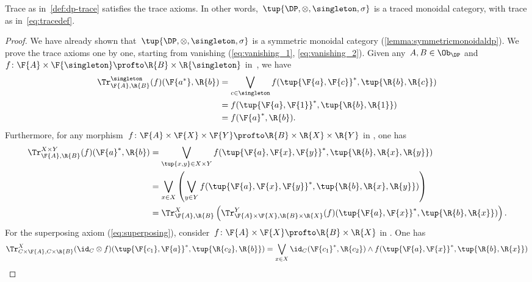 \begin{lemma}
    Trace as in~\cref{def:dp-trace} satisfies the trace axioms. In other words,~$\tup{\DP, \otimes, \singleton, \sigma}$ is a traced monoidal category, with trace as in~\cref{eq:tracedef}.
\end{lemma}
\begin{proof}
    We have already shown that~$\tup{\DP,\otimes,\singleton,\sigma}$ is a symmetric monoidal category (\cref{lemma:symmetricmonoidaldp}).
    We prove the trace axioms one by one, starting from vanishing (\cref{eq:vanishing_1}, \cref{eq:vanishing_2}). Given any~$A,B\in \Ob_\DP$ and~$f\colon \F{A}\times \F{\singleton}\profto \R{B}\times \R{\singleton}$ in~\DP, we have
    \begin{equation}
        \begin{aligned}
            \Tr_{\F{A},\R{B}}^{\singleton}(f)(\F{a^*},\R{b})&=\bigvee_{c\in \singleton}f(\tup{\F{a},\F{c}}^*,\tup{\R{b},\R{c}})\\
            &=f(\tup{\F{a},\F{1}}^*,\tup{\R{b},\R{1}})\\
            &=f(\F{a}^*,\R{b}).
        \end{aligned}
    \end{equation}
    Furthermore, for any morphism~$f\colon \F{A}\times \F{X}\times \F{Y} \profto \R{B}\times \R{X} \times \R{Y}$ in \DP, one has
    \begin{equation}
        \begin{aligned}
            \Tr_{\F{A},\R{B}}^{X\times Y}(f)(\F{a}^*,\R{b})&=\bigvee_{\tup{x,y} \in X\times Y} f(\tup{\F{a},\F{x},\F{y}}^*,\tup{\R{b},\R{x},\R{y}})\\
            &=\bigvee_{x \in X}\left(\bigvee_{y \in Y} f(\tup{\F{a},\F{x},\F{y}}^*,\tup{\R{b},\R{x},\R{y}})\right)\\
            &=\Tr_{\F{A},\R{B}}^X\left(
            \Tr_{\F{A}\times \F{X},\R{B}\times \R{X}}^Y(f)(\tup{\F{a},\F{x}}^*,\tup{\R{b},\R{x}})\right).
        \end{aligned}
    \end{equation}
    For the superposing axiom (\cref{eq:superposing}), consider~$f\colon \F{A}\times \F{X}\profto \R{B}\times \R{X}$ in \DP. One has
    \begin{equation}
        \begin{aligned}
            \Tr_{C\times \F{A},C\times \R{B}}^{X}(\id_C\otimes f)(\tup{\F{c_1},\F{a}}^*,\tup{\R{c_2},\R{b}})&=\bigvee_{x\in X} \id_C(\F{c_1}^*,\R{c_2})\wedge f(\tup{\F{a},\F{x}}^*,\tup{\R{b},\R{x}})\\

\end{aligned}
\end{equation}
\end{proof}
